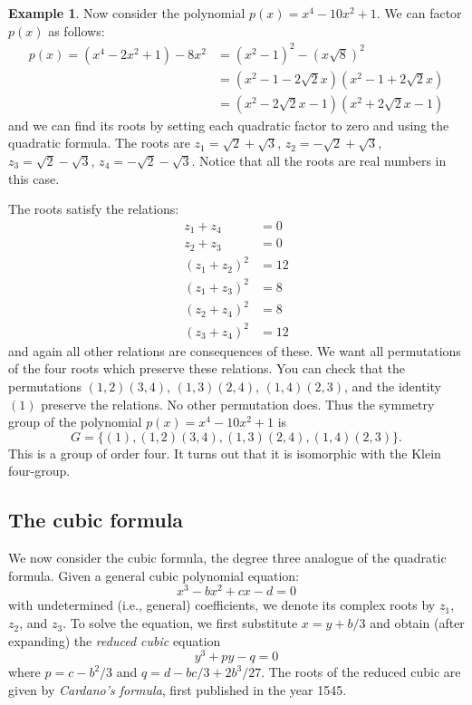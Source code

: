 \documentclass[11pt]{article}
\theoremstyle{definition}
\newtheorem{example}[thm]{Example}
\begin{document}
\begin{example} \label{ex:2}
Now consider the polynomial $p(x) = x^4 -10x^2 + 1$.
We can factor $p(x)$ as follows:
\begin{align*}
p(x) = (x^4 - 2x^2 + 1) - 8x^2 &= (x^2-1)^2 - (x\sqrt{8})^2\\
&= (x^2-1-2\sqrt{2}x)(x^2-1+2\sqrt{2}x) \\
&= (x^2-2\sqrt{2}x-1)(x^2+2\sqrt{2}x-1)
\end{align*}
and we can find its roots by setting each quadratic factor to zero and
using the quadratic formula. The roots are $z_1 = \sqrt{2}+\sqrt{3}$,
$z_2 = -\sqrt{2}+\sqrt{3}$, $z_3 = \sqrt{2}-\sqrt{3}$, $z_4 =
-\sqrt{2}-\sqrt{3}$. Notice that all the roots are real numbers in
this case.

The roots satisfy the relations:
\begin{align*}
z_1+z_4 &= 0 \\
z_2+z_3 &= 0 \\
(z_1+z_2)^2 &= 12 \\
(z_1+z_3)^2 &= 8 \\
(z_2+z_4)^2 &= 8 \\
(z_3+z_4)^2 &= 12 
\end{align*}
and again all other relations are consequences of these. We want all
permutations of the four roots which preserve these relations. You can
check that the permutations $(1,2)(3,4)$, $(1,3)(2,4)$, $(1,4)(2,3)$,
and the identity $(1)$ preserve the relations. No other permutation
does. Thus the symmetry group of the polynomial $p(x) = x^4 -10x^2 +
1$ is $$G = \{ (1), (1,2)(3,4), (1,3)(2,4), (1,4)(2,3) \}.$$ This is a
group of order four. It turns out that it is isomorphic with the Klein
four-group.
\end{example}


\setcounter{equation}{0} 
\subsection*{The cubic formula}
We now consider the cubic formula, the degree three analogue of the quadratic
formula.  Given a general cubic polynomial equation:
\begin{equation}\label{eq:cubic}
  x^3 - bx^2 + cx - d = 0
\end{equation} 
with undetermined (i.e., general) coefficients, we denote its complex
roots by $z_1$, $z_2$, and $z_3$. To solve the equation, we first
substitute $x=y+b/3$ and obtain (after expanding) the {\em reduced
  cubic} equation
\begin{equation}\label{eq:reduced-cubic}
  y^3 +py - q = 0
\end{equation}
where $p = c-b^2/3$ and $q = d - bc/3 + 2b^3/27$. The roots of the
reduced cubic are given by \emph{Cardano's formula}, first published
in the year 1545.
\end{document}
